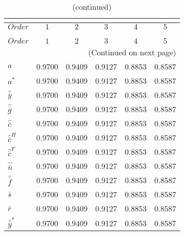  
\begin{center}
\begin{longtable}{lccccc} 
\caption{COEFFICIENTS OF AUTOCORRELATION}\\
 \label{Table:th_autocorr_matrix}\\
\toprule 
$Order                 $	 & 	 $         1$	 & 	 $         2$	 & 	 $         3$	 & 	 $         4$	 & 	 $         5$\\
\midrule \endfirsthead 
\caption{(continued)}\\
 \toprule \\ 
$Order                 $	 & 	 $         1$	 & 	 $         2$	 & 	 $         3$	 & 	 $         4$	 & 	 $         5$\\
\midrule \endhead 
\midrule \multicolumn{6}{r}{(Continued on next page)} \\ \bottomrule \endfoot 
\bottomrule \endlastfoot 
${a}                   $	 & 	    0.9700	 & 	    0.9409	 & 	    0.9127	 & 	    0.8853	 & 	    0.8587 \\ 
${a^*}                 $	 & 	    0.9700	 & 	    0.9409	 & 	    0.9127	 & 	    0.8853	 & 	    0.8587 \\ 
${\hat {\bar y}}       $	 & 	    0.9700	 & 	    0.9409	 & 	    0.9127	 & 	    0.8853	 & 	    0.8587 \\ 
${\hat {\bar g}}       $	 & 	    0.9700	 & 	    0.9409	 & 	    0.9127	 & 	    0.8853	 & 	    0.8587 \\ 
${\hat {\bar c}}       $	 & 	    0.9700	 & 	    0.9409	 & 	    0.9127	 & 	    0.8853	 & 	    0.8587 \\ 
${\hat {\bar c}^H}     $	 & 	    0.9700	 & 	    0.9409	 & 	    0.9127	 & 	    0.8853	 & 	    0.8587 \\ 
${\hat {\bar c}^F}     $	 & 	    0.9700	 & 	    0.9409	 & 	    0.9127	 & 	    0.8853	 & 	    0.8587 \\ 
${\hat {\bar n}}       $	 & 	    0.9700	 & 	    0.9409	 & 	    0.9127	 & 	    0.8853	 & 	    0.8587 \\ 
${\hat {\bar f}}       $	 & 	    0.9700	 & 	    0.9409	 & 	    0.9127	 & 	    0.8853	 & 	    0.8587 \\ 
${\bar s}              $	 & 	    0.9700	 & 	    0.9409	 & 	    0.9127	 & 	    0.8853	 & 	    0.8587 \\ 
${\bar r}              $	 & 	    0.9700	 & 	    0.9409	 & 	    0.9127	 & 	    0.8853	 & 	    0.8587 \\ 
${\hat {\bar y}^*}     $	 & 	    0.9700	 & 	    0.9409	 & 	    0.9127	 & 	    0.8853	 & 	    0.8587 \\ 

\end{longtable}
\end{center}
